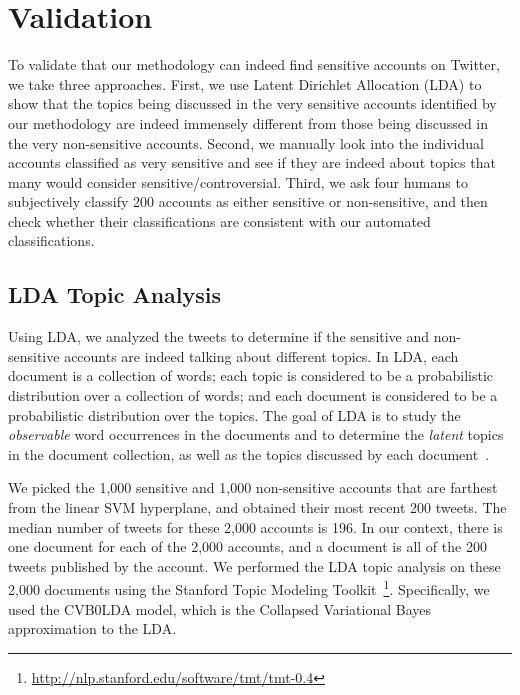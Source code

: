\documentclass[conference]{IEEEtran}
\begin{document}
\section{Validation}
\label{sec:twittersensitivevalidation}

To validate that our methodology can indeed find sensitive accounts on Twitter, we take three approaches. First, we use Latent Dirichlet Allocation (LDA) to show that the topics being discussed in the very sensitive accounts identified by our methodology are indeed immensely different from those being discussed in the very non-sensitive accounts. Second, we manually look into the individual accounts classified as very sensitive and see if they are indeed about topics that many would consider sensitive/controversial. Third,
we ask four humans to subjectively classify 200 accounts as either sensitive or non-sensitive, and then check whether their classifications are consistent with our automated classifications.  


\subsection{LDA Topic Analysis}
\label{sec:ldatopicanalysis}

Using LDA, we analyzed the tweets to determine if the sensitive and non-sensitive accounts are indeed talking about different topics.
In LDA, each document is a collection of words; each topic is considered to be a probabilistic distribution over a collection of words; and each document is considered to be a probabilistic distribution over the topics. The goal of LDA is to study the \textit{observable} word occurrences in the documents and to determine the \textit{latent} topics in the document collection, as well as the topics discussed by each document~\cite{blei2003lda}.

We picked the 1,000 sensitive and 1,000 non-sensitive accounts that are farthest from the linear SVM hyperplane,
and obtained their most recent 200 tweets. The median number of tweets for these 2,000 accounts is 196. 
In our context, there is one document for each of the 2,000 accounts, and a document is all of the 200 tweets published by the account. 
We performed the LDA topic analysis on these 2,000 documents using the Stanford Topic Modeling Toolkit~\footnote{\url{http://nlp.stanford.edu/software/tmt/tmt-0.4}}. Specifically, we used the CVB0LDA model, which is the Collapsed Variational Bayes approximation to the LDA.
\end{document}
